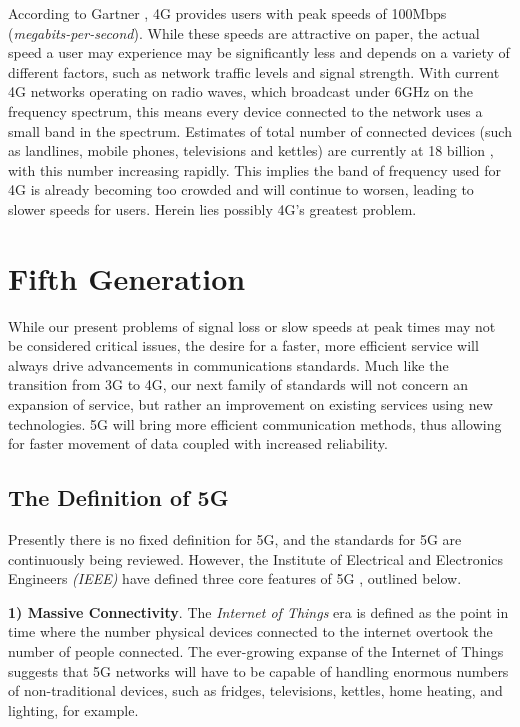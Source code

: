\documentclass[journal]{IEEEtran}
\begin{document}
According to Gartner \cite{gartner4g}, 4G provides users with peak speeds of 100Mbps (\textit{megabits-per-second}). While these speeds are attractive on paper, the actual speed a user may experience may be significantly less and depends on a variety of different factors, such as network traffic levels and signal strength. With current 4G networks operating on radio waves, which broadcast under 6GHz on the frequency spectrum, this means every device connected to the network uses a small band in the spectrum. Estimates of total number of connected devices (such as landlines, mobile phones, televisions and kettles) are currently at 18 billion \cite{ericssondev}, with this number increasing rapidly. This implies the band of frequency used for 4G is already becoming too crowded and will continue to worsen, leading to slower speeds for users. Herein lies possibly 4G's greatest problem.

\section{Fifth Generation}
While our present problems of signal loss or slow speeds at peak times may not be considered critical issues, the desire for a faster, more efficient service will always drive advancements in communications standards. Much like the transition from 3G to 4G, our next family of standards will not concern an expansion of service, but rather an improvement on existing services using new technologies. 5G will bring more efficient communication methods, thus allowing for faster movement of data coupled with increased reliability.

\subsection{The Definition of 5G} \label{subsec:def5g}
Presently there is no fixed definition for 5G, and the standards for 5G are continuously being reviewed. However, the Institute of Electrical and Electronics Engineers \textit{(IEEE)} have defined three core features of 5G \cite{ieee5g}, outlined below. 

\textbf{1) Massive Connectivity}. The \textit{Internet of Things} era is defined as the point in time where the number physical devices connected to the internet overtook the number of people connected. The ever-growing expanse of the Internet of Things suggests that 5G networks will have to be capable of handling enormous numbers of non-traditional devices, such as fridges, televisions, kettles, home heating, and lighting, for example.
\end{document}
